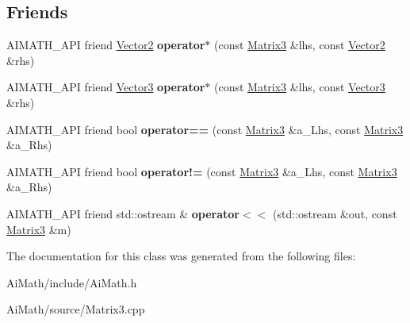\subsection*{Friends}
\begin{DoxyCompactItemize}
\item 
\hypertarget{class_ai_math_1_1_matrix3_ac7a81d9ffa5781ba90898cef63ed491c}{A\+I\+M\+A\+T\+H\+\_\+\+A\+P\+I friend \hyperlink{class_ai_math_1_1_vector2}{Vector2} {\bfseries operator$\ast$} (const \hyperlink{class_ai_math_1_1_matrix3}{Matrix3} \&lhs, const \hyperlink{class_ai_math_1_1_vector2}{Vector2} \&rhs)}\label{class_ai_math_1_1_matrix3_ac7a81d9ffa5781ba90898cef63ed491c}

\item 
\hypertarget{class_ai_math_1_1_matrix3_a89dd4fc730cb672e8972ef7339ccff9f}{A\+I\+M\+A\+T\+H\+\_\+\+A\+P\+I friend \hyperlink{class_ai_math_1_1_vector3}{Vector3} {\bfseries operator$\ast$} (const \hyperlink{class_ai_math_1_1_matrix3}{Matrix3} \&lhs, const \hyperlink{class_ai_math_1_1_vector3}{Vector3} \&rhs)}\label{class_ai_math_1_1_matrix3_a89dd4fc730cb672e8972ef7339ccff9f}

\item 
\hypertarget{class_ai_math_1_1_matrix3_a0b19a64a155c91581e7d0cb2795380d7}{A\+I\+M\+A\+T\+H\+\_\+\+A\+P\+I friend bool {\bfseries operator==} (const \hyperlink{class_ai_math_1_1_matrix3}{Matrix3} \&a\+\_\+\+Lhs, const \hyperlink{class_ai_math_1_1_matrix3}{Matrix3} \&a\+\_\+\+Rhs)}\label{class_ai_math_1_1_matrix3_a0b19a64a155c91581e7d0cb2795380d7}

\item 
\hypertarget{class_ai_math_1_1_matrix3_a214f40eb4b2d67d72fc763ab76a915a8}{A\+I\+M\+A\+T\+H\+\_\+\+A\+P\+I friend bool {\bfseries operator!=} (const \hyperlink{class_ai_math_1_1_matrix3}{Matrix3} \&a\+\_\+\+Lhs, const \hyperlink{class_ai_math_1_1_matrix3}{Matrix3} \&a\+\_\+\+Rhs)}\label{class_ai_math_1_1_matrix3_a214f40eb4b2d67d72fc763ab76a915a8}

\item 
\hypertarget{class_ai_math_1_1_matrix3_a1750f64266cfe896da464c809ae40257}{A\+I\+M\+A\+T\+H\+\_\+\+A\+P\+I friend std\+::ostream \& {\bfseries operator$<$$<$} (std\+::ostream \&out, const \hyperlink{class_ai_math_1_1_matrix3}{Matrix3} \&m)}\label{class_ai_math_1_1_matrix3_a1750f64266cfe896da464c809ae40257}

\end{DoxyCompactItemize}


The documentation for this class was generated from the following files\+:\begin{DoxyCompactItemize}
\item 
Ai\+Math/include/Ai\+Math.\+h\item 
Ai\+Math/source/Matrix3.\+cpp\end{DoxyCompactItemize}
